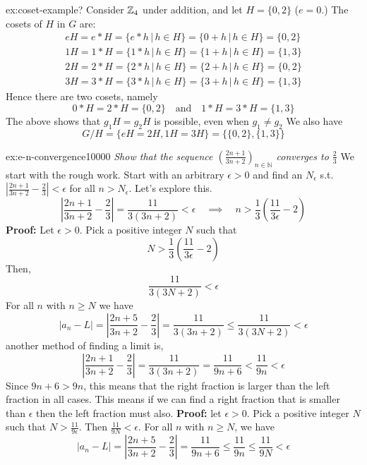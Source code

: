 \documentclass[landscape, 8pt]{extarticle}
\begin{document}
\begin{multicols}{3}
\begin{xmp}{ex:coset-example}{?}
    Consider $\mathbb{Z}_{4}$ under addition, and let $H=\{0,2\}$ ($e=0$.) The cosets of $H$ in $G$ are:
    \begin{align}
    eH = e * H = \{e * h\,|\,h\in H\} = \{0+h\,|\, h\in H\} = \{0,2\} \\
    1H = 1 * H = \{1 * h\,|\,h\in H\} = \{1+h\,|\, h\in H\} = \{1,3\} \\
    2H = 2 * H = \{2 * h\,|\,h\in H\} = \{2+h\,|\, h\in H\} = \{0,2\} \\
    3H = 3 * H = \{3 * h\,|\,h\in H\} = \{3+h\,|\, h\in H\} = \{1,3\}
    \end{align}
    Hence there are two cosets, namely
    \[0 * H=2 * H=\{0,2\} \quad\text{and}\quad 1 * H=3 * H=\{1,3\}\]
    The above shows that $g_{1}H=g_{2}H$ is possible, even when $g_{1}\ne g_{2}$
    We also have
    \[G/H=\{eH=2H,1H=3H\} = \{\{0,2\}, \{1,3\}\}\]
\end{xmp}
\vspace{-5pt}


\begin{xmp}{ex:e-n-convergence}{10000}
    \textit{Show that the sequence $\left( \frac{2n+1}{3n+2} \right)_{n\in\mathbb{N}}$ converges to $\frac{2}{3}$}
    \vspace{0pt}\newline
    We start with the rough work. Start with an arbitrary $\epsilon>0$ and find an $N_{\epsilon}$ s.t. $\left\lvert  \frac{2n+1}{3n+2} -\frac{2}{3}  \right\rvert < \epsilon$ for all $n>N_{\epsilon}$. Let's explore this.
    \[\left\lvert  \frac{2n+1}{3n+2}-\frac{2}{3}  \right\rvert =\frac{11}{3(3n+2)} < \epsilon\quad\implies \quad n> \frac{1}{3}\left( \frac{11}{3\epsilon} -2\right)\]
    \textbf{Proof:} Let $\epsilon>0$. Pick a positive integer $N$ such that
    \[N>\frac{1}{3}\left( \frac{11}{3\epsilon}-2 \right)\]
    Then,
    \[\frac{11}{3(3N+2)} < \epsilon\]
    For all $n$ with $n\ge N$ we have 
    \[\lvert a_{n}-L \rvert = \left\lvert  \frac{2n+5}{3n+2} - \frac{2}{3}  \right\rvert =\frac{11}{3(3n+2)} \le \frac{11}{3(3N+2)}<\epsilon\]
    another method of finding a limit is,
    $$\left\lvert  \frac{2n+1}{3n+2}-\frac{2}{3}  \right\rvert =\frac{11}{3(3n+2)} = \frac{11}{9n+6} < \frac{11}{9n}< \epsilon$$
    Since $9n+6>9n$, this means that the right fraction is larger than the left fraction in all cases. This means if we can find a right fraction that is smaller than $\epsilon$ then the left fraction must also.
    \vspace{0pt}\newline 
    \textbf{Proof:} let $\epsilon>0$. Pick a positive integer $N$ such that $N>\frac{11}{9\epsilon}$. Then $\frac{11}{9N} < \epsilon$. For all $n$ with $n\ge N$, we have
    $$\lvert a_{n}-L \rvert = \left\lvert  \frac{2n+5}{3n+2} - \frac{2}{3}  \right\rvert =\frac{11}{9n+6} \le \frac{11}{9n} \le \frac{11}{9N}<\epsilon$$
\end{xmp}
\vspace{-5pt}


\end{multicols}
\end{document}
